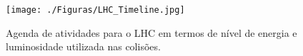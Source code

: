 \begin{figure}[H]
	\begin{center}         
		\caption{Agenda de atividades para o LHC em termos de nível de energia e luminosidade utilizada nas colisões.}
		\texttt{[image: ./Figuras/LHC\_Timeline.jpg]}
		\label{fig:agendaLHC}
	\end{center}
\end{figure}


%
%
%
%
%

